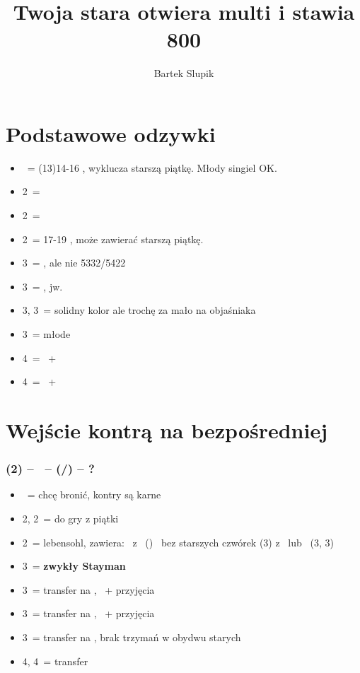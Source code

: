 \documentclass[12pt, a4paper]{article}
\title{Twoja stara otwiera multi i stawia 800}
\date{}
\author{Bartek Slupik}
\begin{document}
\maketitle
\section{Podstawowe odzywki}
\begin{itemize}
    \item \dbl\ = (13)14-16 \bal, wyklucza starszą piątkę. Młody singiel OK. \vimp
    \item 2\hearts\ = \hearts
    \item 2\spades\ = \spades
    \item 2\nt\ = 17-19 \bal, może zawierać starszą piątkę. \imp \br
    \item 3\clubs\ = \clubs, ale nie 5332/5422
    \item 3\diams\ = \diams, jw.
    \item 3\hearts, 3\spades\ = solidny kolor ale trochę za mało na objaśniaka
    \item 3\nt\ = młode \vimp
    \item 4\clubs\ = \clubs\ + \hearts\spades
    \item 4\diams\ = \diams\ + \hearts\spades
\end{itemize}

\pagebreak


\section{Wejście kontrą na bezpośredniej}
\subsubsection*{(2\diams) -- \dbl\ -- (\rdbl/\passx) -- ?}
\begin{itemize}
    \item \pass\ = chcę bronić, kontry są karne
    \item 2\hearts, 2\spades\ = do gry z piątki
    \item 2\nt\ = lebensohl, zawiera:
    \subitem \soff\ z \clubs\ (\pass)
    \subitem \gf\ bez starszych czwórek (3\diams) \vimp
    \subitem \inv z \hearts\ lub \spades\ (3\hearts, 3\spades)
    \item 3\clubs\ = \textbf{zwykły Stayman} \vimp
    \item 3\diams\ = transfer na \hearts, \gf\ + przyjęcia
    \item 3\hearts\ = transfer na \spades, \gf\ + przyjęcia \br
    \item 3\spades\ = transfer na \nt, brak trzymań w obydwu starych
    \item 4\diams, 4\hearts\ = transfer
\end{itemize}
\end{document}
